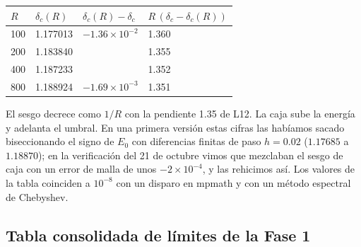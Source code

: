\documentclass[11pt]{article}
\newcommand{\dc}{\delta_c}
\begin{document}
\begin{table}[H]
\centering
\small
\begin{tabular}{@{}llll@{}}
\toprule
$R$ & $\dc(R)$ & $\dc(R)-\dc$ & $R\,(\dc-\dc(R))$\\
\midrule
100 & 1.177013 & $-1.36\times10^{-2}$ & 1.360\\
200 & 1.183840 & & 1.355\\
400 & 1.187233 & & 1.352\\
800 & 1.188924 & $-1.69\times10^{-3}$ & 1.351\\
\bottomrule
\end{tabular}
\end{table}

El sesgo decrece como $1/R$ con la pendiente 1.35 de L12. La caja sube la energía y adelanta el umbral. En una primera versión estas cifras las habíamos sacado biseccionando el signo de $E_0$ con diferencias finitas de paso $h=0.02$ ($1.17685$ a $1.18870$); en la verificación del 21 de octubre vimos que mezclaban el sesgo de caja con un error de malla de unos $-2\times10^{-4}$, y las rehicimos así. Los valores de la tabla coinciden a $10^{-8}$ con un disparo en mpmath y con un método espectral de Chebyshev.

\subsection{Tabla consolidada de límites de la Fase 1}
\end{document}
